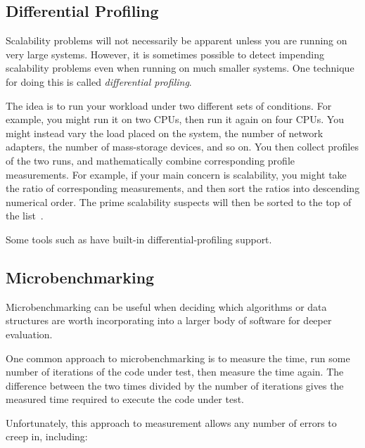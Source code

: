 \subsection{Differential Profiling}
\label{sec:debugging:Differential Profiling}

Scalability problems will not necessarily be apparent unless you are running
on very large systems.
However, it is sometimes possible to detect impending scalability problems
even when running on much smaller systems.
One technique for doing this is called \emph{differential profiling}.

The idea is to run your workload under two different sets of conditions.
For example, you might run it on two CPUs, then run it again on four
CPUs.
You might instead vary the load placed on the system, the number of
network adapters, the number of mass-storage devices, and so on.
You then collect profiles of the two runs, and mathematically combine
corresponding profile measurements.
For example, if your main concern is scalability, you might take the
ratio of corresponding measurements, and then sort the ratios into
descending numerical order.
The prime scalability suspects will then be sorted to the top of the
list~\cite{McKenney95a,McKenney99b}.

Some tools such as  have built-in differential-profiling
support.

\subsection{Microbenchmarking}
\label{sec:debugging:Microbenchmarking}

Microbenchmarking can be useful when deciding which algorithms or
data structures are worth incorporating into a larger body of software
for deeper evaluation.

One common approach to microbenchmarking is to measure the time,
run some number of iterations of the code
under test, then measure the time again.
The difference between the two times divided by the number of iterations
gives the measured time required to execute the code under test.

Unfortunately, this approach to measurement allows any number of errors
to creep in, including:


